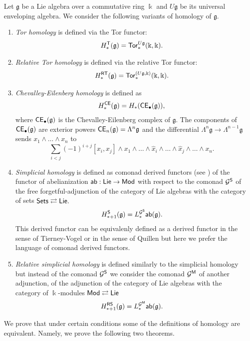 \documentclass{amsart}
\numberwithin{equation}{section}
\theoremstyle{definition}
\def\GG{\mathcal{G}}
\def\gg{\mathfrak{g}}
\def\kk{\Bbbk}
\begin{document}
Let $\gg$ be a Lie algebra over a commutative ring $\kk$ and $U\gg$ be its universal enveloping algebra. We consider the following variants of homology of $\gg$.
\begin{enumerate}
\item {\it Tor homology} is defined via the Tor functor: $$H^{\sf T}_*(\gg)={\sf Tor}^{U\gg}_*(\kk,\kk).$$
\item {\it Relative Tor homology} is defined via the relative Tor functor: $$H^{\sf RT}_*(\gg)={\sf Tor}^{(U\gg,\kk)}_*(\kk,\kk).$$
\item {\it Chevalley-Eilenberg homology} is defined as
$$H^{\sf CE}_*(\gg)=H_*({\sf CE}_\bullet(\gg)),$$
where ${\sf CE}_\bullet(\gg)$ is  the Chevalley-Eilenberg complex of $\gg.$ The components of ${\sf CE}_\bullet(\gg)$ are exterior powers  ${\sf CE}_n(\gg)=\Lambda^n \gg$ and the differential $\Lambda^n \gg\to \Lambda^{n-1} \gg$ sends $x_1\wedge \dots \wedge x_n$ to 
$$\sum_{i<j}(-1)^{i+j}   [x_i,x_j] \wedge x_1\wedge \dots \wedge \hat x_i \wedge \dots \wedge \hat x_j \wedge \dots \wedge x_n.$$

\item {\it Simplicial homology} is defined as comonad derived functors (see \cite{barr1969homology}) of the functor of abelianization ${\sf ab}:{\sf Lie} \to {\sf Mod}$ with respect to the comonad $\GG^{\sf S}$ of the free forgetful-adjunction of the category of Lie algebras with the category of sets
${\sf Sets} \rightleftarrows {\sf Lie}.$ 
$$H_{*+1}^{\sf S}(\gg)=L_*^{\GG^{\sf S}} {\sf ab}(\gg).$$
This derived functor can be equivalenly defined as a derived functor in the sense of Tierney-Vogel \cite{tierney1969simplicial} or in the sense of Quillen \cite[Ch. XIII]{cartan1999homological} but here we prefer the language of comonad derived functors. 

\item {\it Relative simplicial homology} is defined similarly to the simplicial homology but instead of the comonad $\GG^{\sf S}$ we consider the comonad $\GG^{\sf M}$  of another adjunction, of the adjunction of the category of Lie algebras with the category of $\kk$-modules
${\sf Mod} \rightleftarrows {\sf Lie}$
$$H^{\sf RS}_{*+1}(\gg)=L_*^{\GG^{\sf M}} {\sf ab}(\gg).$$
\end{enumerate}


We prove that under certain conditions some of the definitions of homology are equivalent. Namely, we prove the following two theorems.

\bigskip 
\end{document}
